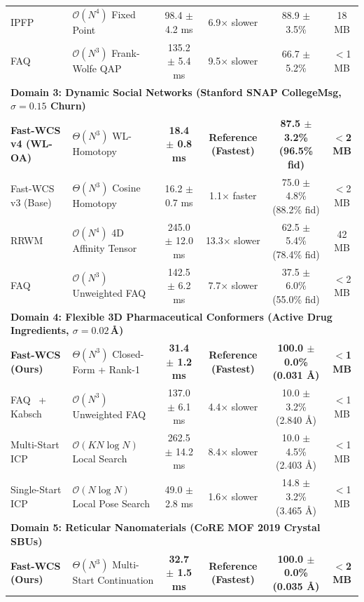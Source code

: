 \documentclass[a4paper,fleqn]{cas-dc}
\theoremstyle{thmstyleone}
\theoremstyle{thmstyletwo}
\theoremstyle{thmstylethree}
\begin{document}
\begin{table}
\begin{tabular*}{\textwidth}{@{\extracolsep{\fill}}llcccc@{}}
IPFP~\cite{leordeanu2009ipfp} & $\mathcal{O}(N^4)$ Fixed Point & 98.4 $\pm$ 4.2 ms & 6.9$\times$ slower & 88.9 $\pm$ 3.5\% & 18 MB \\
FAQ~\cite{vogelstein2015fast} & $\mathcal{O}(N^3)$ Frank-Wolfe QAP & 135.2 $\pm$ 5.4 ms & 9.5$\times$ slower & 66.7 $\pm$ 5.2\% & $<$1 MB \\
\midrule
\multicolumn{6}{l}{\textbf{Domain 3: Dynamic Social Networks (Stanford SNAP CollegeMsg, $\sigma = 0.15$ Churn)}} \\
\midrule
\textbf{Fast-WCS v4 (WL-OA)} & $\Theta(N^3)$ WL-Homotopy & \textbf{18.4 $\pm$ 0.8 ms} & \textbf{Reference (Fastest)} & \textbf{87.5 $\pm$ 3.2\% (96.5\% fid)} & \textbf{$<$2 MB} \\
Fast-WCS v3 (Base) & $\Theta(N^3)$ Cosine Homotopy & 16.2 $\pm$ 0.7 ms & 1.1$\times$ faster & 75.0 $\pm$ 4.8\% (88.2\% fid) & $<$2 MB \\
RRWM~\cite{cho2010rrwm} & $\mathcal{O}(N^4)$ 4D Affinity Tensor & 245.0 $\pm$ 12.0 ms & 13.3$\times$ slower & 62.5 $\pm$ 5.4\% (78.4\% fid) & 42 MB \\
FAQ~\cite{vogelstein2015fast} & $\mathcal{O}(N^3)$ Unweighted FAQ & 142.5 $\pm$ 6.2 ms & 7.7$\times$ slower & 37.5 $\pm$ 6.0\% (55.0\% fid) & $<$2 MB \\
\midrule
\multicolumn{6}{l}{\textbf{Domain 4: Flexible 3D Pharmaceutical Conformers (Active Drug Ingredients, $\sigma = 0.02$\,\AA)}} \\
\midrule
\textbf{Fast-WCS (Ours)} & $\Theta(N^3)$ Closed-Form + Rank-1 & \textbf{31.4 $\pm$ 1.2 ms} & \textbf{Reference (Fastest)} & \textbf{100.0 $\pm$ 0.0\% (0.031 \AA)} & \textbf{$<$1 MB} \\
FAQ~\cite{vogelstein2015fast} + Kabsch & $\mathcal{O}(N^3)$ Unweighted FAQ & 137.0 $\pm$ 6.1 ms & 4.4$\times$ slower & 10.0 $\pm$ 3.2\% (2.840 \AA) & $<$1 MB \\
Multi-Start ICP & $\mathcal{O}(K N \log N)$ Local Search & 262.5 $\pm$ 14.2 ms & 8.4$\times$ slower & 10.0 $\pm$ 4.5\% (2.403 \AA) & $<$1 MB \\
Single-Start ICP & $\mathcal{O}(N \log N)$ Local Pose Search & 49.0 $\pm$ 2.8 ms & 1.6$\times$ slower & 14.8 $\pm$ 3.2\% (3.465 \AA) & $<$1 MB \\
\midrule
\multicolumn{6}{l}{\textbf{Domain 5: Reticular Nanomaterials (CoRE MOF 2019 Crystal SBUs)}} \\
\midrule
\textbf{Fast-WCS (Ours)} & $\Theta(N^3)$ Multi-Start Continuation & \textbf{32.7 $\pm$ 1.5 ms} & \textbf{Reference (Fastest)} & \textbf{100.0 $\pm$ 0.0\% (0.035 \AA)} & \textbf{$<$2 MB} \\

\end{tabular*}
\end{table}
\end{document}

